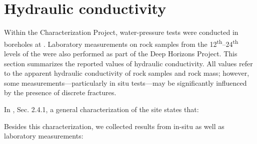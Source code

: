 \section{Hydraulic conductivity}
\label{sec:hydro_cond}
Within the Characterization Project, water-pressure tests were conducted in boreholes at \URFBII. Laboratory measurements on rock samples from the 12\textsuperscript{th}--24\textsuperscript{th} levels of the \Rozna were also performed as part of the Deep Horizons Project. This section summarizes the reported values of hydraulic conductivity. All values refer to the apparent hydraulic conductivity of rock samples and rock mass; however, some measurements---particularly in situ tests---may be significantly influenced by the presence of discrete fractures.


In \cite{tz_char_1}, Sec. 2.4.1, a general characterization of the site states that:
%
\begin{center}
\begin{minipage}{0.8\textwidth}
\it {}
\end{minipage}
\end{center}
%
Besides this characterization, we collected results from in-situ as well as laboratory measurements:
